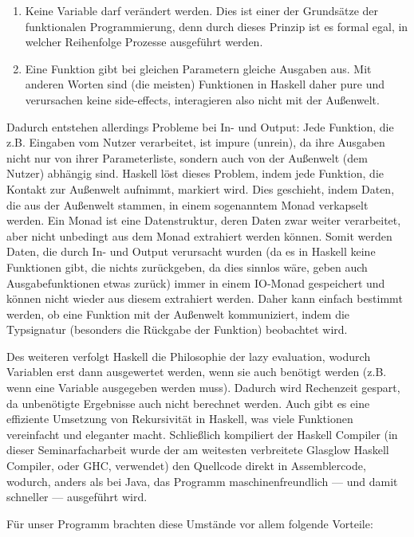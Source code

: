 \documentclass[twoside,a4paper,draft]{article}
\begin{document}
\begin{multicols}{2}
\begin{enumerate}
\item Keine Variable darf verändert werden. Dies ist einer der Grundsätze der funktionalen Programmierung, denn durch dieses Prinzip ist es formal egal, in welcher Reihenfolge Prozesse ausgeführt werden.
\item Eine Funktion gibt bei gleichen Parametern gleiche Ausgaben aus. Mit anderen Worten sind (die meisten) Funktionen in Haskell daher \glqq{}pure\grqq{} und verursachen keine \glqq{}side-effects\grqq{}, interagieren also nicht mit der Außenwelt.
\end{enumerate}

Dadurch entstehen allerdings Probleme bei In- und Output: Jede Funktion, die z.B. Eingaben vom Nutzer verarbeitet, ist \glqq{}impure\grqq{} (unrein), da ihre Ausgaben nicht nur von ihrer Parameterliste, sondern auch von der Außenwelt (dem Nutzer) abhängig sind. Haskell löst dieses Problem, indem jede Funktion, die Kontakt zur Außenwelt aufnimmt, markiert wird. Dies geschieht, indem Daten, die aus der Außenwelt stammen, in einem sogenanntem \glqq{}Monad\grqq{} verkapselt werden. Ein Monad ist eine Datenstruktur, deren Daten zwar weiter verarbeitet, aber nicht unbedingt aus dem Monad extrahiert werden können. Somit werden Daten, die durch In- und Output verursacht wurden (da es in Haskell keine Funktionen gibt, die nichts zurückgeben, da dies sinnlos wäre, geben auch Ausgabefunktionen etwas zurück) immer in einem \glqq{}IO-Monad\grqq{} gespeichert und können nicht wieder aus diesem extrahiert werden. Daher kann einfach bestimmt werden, ob eine Funktion mit der Außenwelt kommuniziert, indem die Typsignatur (besonders die Rückgabe der Funktion) beobachtet wird.

Des weiteren verfolgt Haskell die Philosophie der \glqq{}lazy evaluation\grqq{}, wodurch Variablen erst dann ausgewertet werden, wenn sie auch benötigt werden (z.B. wenn eine Variable ausgegeben werden muss). Dadurch wird Rechenzeit gespart, da unbenötigte Ergebnisse auch nicht berechnet werden. Auch gibt es eine effiziente Umsetzung von Rekursivität in Haskell, was viele Funktionen vereinfacht und eleganter macht. Schließlich kompiliert der Haskell Compiler (in dieser Seminarfacharbeit wurde der am weitesten verbreitete Glasglow Haskell Compiler, oder GHC, verwendet) den Quellcode direkt in Assemblercode, wodurch, anders als bei Java, das Programm maschinenfreundlich --- und damit schneller --- ausgeführt wird.

Für unser Programm brachten diese Umstände vor allem folgende Vorteile:


\end{multicols}
\end{document}
